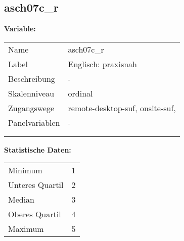 	
	
	\subsection{asch07c\_r}
	\label{subSection:asch07c_r}

	\noindent\textbf{Variable:}\\
		\begin{tabular}{lL{11.3cm}}
			\label{tableVariable:asch07c_r}
			Name & asch07c\_r \\
			Label & Englisch: praxisnah \\
			Beschreibung & - \\
			Skalenniveau & ordinal \\
			Zugangswege &
				remote-desktop-suf,
				onsite-suf,
 \\
			Panelvariablen & -
			 \\
			 \\
 \\
		\end{tabular}



		\vspace*{1 cm}
		\noindent\textbf{Statistische Daten:}\\
			\begin{tabular}{ll}
				\label{tableStatistics:asch07c_r}
					Minimum & 1 \\
					Unteres Quartil & 2 \\
					Median & 3 \\
					Oberes Quartil & 4 \\
					Maximum & 5 \\
			\end{tabular}



